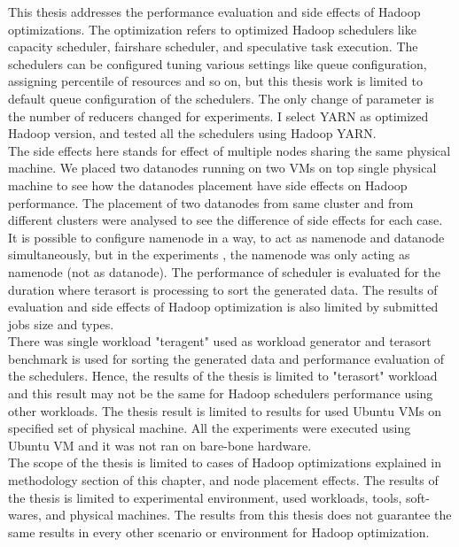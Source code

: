  This thesis addresses the performance evaluation and side effects of Hadoop optimizations. The optimization refers to optimized Hadoop schedulers like capacity scheduler, fairshare scheduler, and speculative task execution. The schedulers can be configured tuning various settings like queue configuration, assigning percentile of resources and so on, but this thesis work is limited to default queue configuration of the schedulers. The only change of parameter is the number of reducers changed for experiments. I select YARN‌ as optimized Hadoop version, and tested all the schedulers  using Hadoop YARN. \\
 


The side effects here stands for effect of multiple nodes sharing the same physical machine. We placed two datanodes running on two VMs on top single physical machine to see how the datanodes placement have side effects on Hadoop performance. The placement of two datanodes from same cluster and from different clusters were analysed to see the difference of side effects for each case. It is possible to configure namenode in a way, to act as namenode and datanode simultaneously, but in the experiments , the namenode was only acting as namenode (not as datanode). The performance of scheduler is evaluated for the duration where terasort is processing to sort the generated data. The results of evaluation and side effects of Hadoop optimization is also limited by submitted jobs size and types.\\

There was single workload "teragent" used as workload generator and terasort benchmark is used for sorting the generated data and performance evaluation of the schedulers. Hence, the results of the thesis is limited to "terasort" workload and this result may not be the same for Hadoop schedulers performance using other workloads. The thesis result is limited to results for used Ubuntu VMs on specified set of physical machine.  All the experiments were executed using Ubuntu VM and it was not ran on bare-bone hardware.\\

 The scope of the thesis is limited to cases of Hadoop optimizations explained in methodology section of this chapter, and node placement effects. The results of the thesis is limited to experimental environment, used workloads, tools, soft-wares, and physical machines. The results from this thesis does not guarantee the same results in every other scenario or environment for Hadoop optimization. \\

